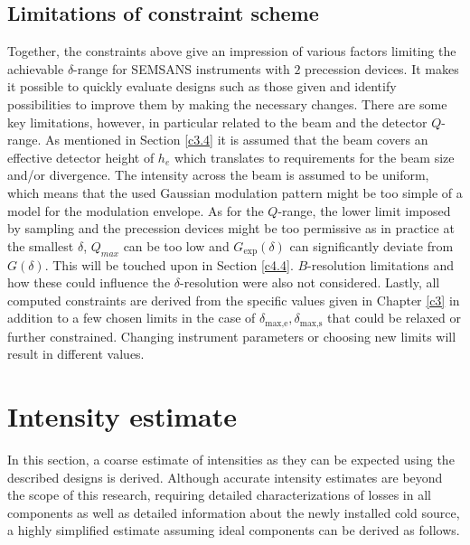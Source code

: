 \subsection{Limitations of constraint scheme}
Together, the constraints above give an impression of various factors limiting the achievable $\delta$-range for SEMSANS instruments with $2$ precession devices. It makes it possible to quickly evaluate designs such as those given and identify possibilities to improve them by making the necessary changes. There are some key limitations, however, in particular related to the beam and the detector $Q$-range. As mentioned in Section \ref{c3.4} it is assumed that the beam covers an effective detector height of $h_e$ which translates to requirements for the beam size and/or divergence. The intensity across the beam is assumed to be uniform, which means that the used Gaussian modulation pattern might be too simple of a model for the modulation envelope. As for the $Q$-range, the lower limit imposed by sampling and the precession devices might be too permissive as in practice at the smallest $\delta$, $Q_{max}$ can be too low and $G_\text{exp}(\delta)$ can significantly deviate from $G(\delta)$. This will be touched upon in Section \ref{c4.4}. $B$-resolution limitations and how these could influence the $\delta$-resolution were also not considered. Lastly, all computed constraints are derived from the specific values given in Chapter \ref{c3} in addition to a few chosen limits in the case of $\delta_{\text{max,e}}, \delta_{\text{max,s}}$ that could be relaxed or further constrained. Changing instrument parameters or choosing new limits will result in different values.

\section{Intensity estimate}
\label{c4.3}
In this section, a coarse estimate of intensities as they can be expected using the described designs is derived. Although accurate intensity estimates are beyond the scope of this research, requiring detailed characterizations of losses in all components as well as detailed information about the newly installed cold source, a highly simplified estimate assuming ideal components can be derived as follows.

